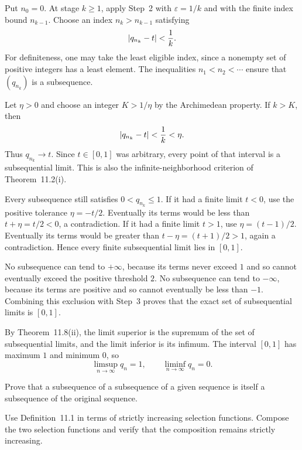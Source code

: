 Put $n_0=0$. At stage $k\ge1$, apply Step~2 with
$\varepsilon=1/k$ and with the finite index bound $n_{k-1}$.
Choose an index $n_k>n_{k-1}$ satisfying
\[
 \left|q_{n_k}-t\right|<\frac1k.
\]
For definiteness, one may take the least eligible index, since a
nonempty set of positive integers has a least element.
The inequalities $n_1<n_2<\cdots$ ensure that $(q_{n_k})$
is a subsequence.

Let $\eta>0$ and choose an integer $K>1/\eta$ by the Archimedean
property. If $k>K$, then
\[
 \left|q_{n_k}-t\right|<\frac1k<\eta.
\]
Thus $q_{n_k}\to t$. Since $t\in[0,1]$ was arbitrary, every
point of that interval is a subsequential limit. This is also the
infinite-neighborhood criterion of Theorem~11.2(i).

Every subsequence still satisfies $0<q_{n_k}\le1$.
If it had a finite limit $t<0$, use the positive tolerance
$\eta=-t/2$. Eventually its terms would be less than
$t+\eta=t/2<0$, a contradiction. If it had a finite limit $t>1$,
use $\eta=(t-1)/2$. Eventually its terms would be greater than
$t-\eta=(t+1)/2>1$, again a contradiction. Hence every finite
subsequential limit lies in $[0,1]$.

No subsequence can tend to $+\infty$, because its terms never exceed
$1$ and so cannot eventually exceed the positive threshold $2$.
No subsequence can tend to $-\infty$, because its terms are positive
and so cannot eventually be less than $-1$.
Combining this exclusion with Step~3 proves that the exact set of
subsequential limits is $[0,1]$.

By Theorem~11.8(ii), the limit superior is the supremum of the set
of subsequential limits, and the limit inferior is its infimum.
The interval $[0,1]$ has maximum $1$ and minimum $0$, so
\[
 \limsup_{n\to\infty}q_n=1,
 \qquad \liminf_{n\to\infty}q_n=0.
\]


\goal Prove that a subsequence of a subsequence of a given sequence
is itself a subsequence of the original sequence.

\idea Use Definition~11.1 in terms of strictly increasing selection
functions. Compose the two selection functions and verify that the
composition remains strictly increasing.

